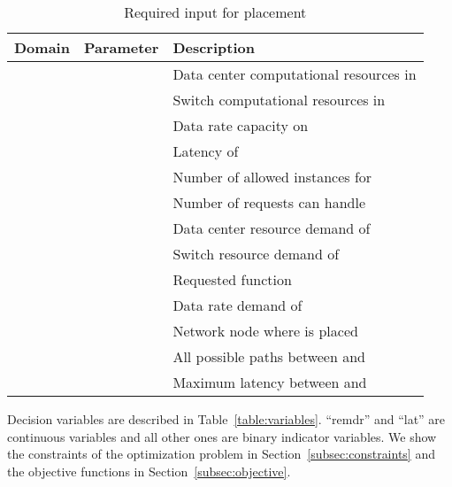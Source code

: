 \documentclass[10pt,a4paper,conference]{IEEEtran}
\begin{document}
\begin{table}[!t]
\caption{Required input for placement}
\label{table:placementparams}
\centering
\begin{tabular}{lll}
\hline
Domain                                                   & Parameter               & Description                         \\ \hline\hline
\multirow{2}{*}{}                     &               & Data center computational resources in           \\  
\multicolumn{1}{l}{}                                   &                & Switch computational resources in               \\ \hline
\multirow{2}{*}{}                &              & Data rate capacity on                           \\  
                                                         &              & Latency of                                        \\ \hline
\multirow{4}{*}{}                     &     & Number of allowed instances for                  \\  
                                                         &      & Number of requests  can handle       \\  
                                                         &               & Data center resource demand of     \\  
                                                         &               & Switch resource demand of         \\ \hline
                                      &                 & Requested function               \\ \hline
                  &  & Data rate demand of                             \\ \hline
                                      &        & Network node where  is placed \\ \hline
\multirow{2}{*}{} &  & All possible paths between  and         \\  
                                                         &   & Maximum latency between  and   \\ \hline
\end{tabular}
\end{table}


Decision variables are described in Table~\ref{table:variables}. 
``remdr'' and ``lat'' are continuous variables and all other ones are binary 
indicator variables. We show the constraints of the optimization problem in 
Section~\ref{subsec:constraints} and the objective functions in Section~\ref{subsec:objective}.
\end{document}
